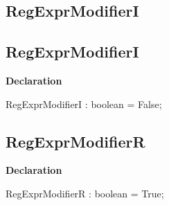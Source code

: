 \documentclass{report}
\newif\ifpdf
\begin{document}
\subsection*{\large{\textbf{RegExprModifierI}}\normalsize\hspace{1ex}\hrulefill}
\else
\subsection*{RegExprModifierI}
\fi
\label{RegExpr-RegExprModifierI}
\begin{list}{}{
\setlength{\itemindent}{0cm}
\setlength{\listparindent}{0cm}
\setlength{\leftmargin}{\evensidemargin}
\addtolength{\leftmargin}{\tmplength}
\settowidth{\labelsep}{X}
\addtolength{\leftmargin}{\labelsep}
\setlength{\labelwidth}{\tmplength}
}
\item[\textbf{Declaration}\hfill]
\ifpdf
\begin{flushleft}
\fi
\begin{ttfamily}
RegExprModifierI : boolean = False;\end{ttfamily}

\ifpdf
\end{flushleft}
\fi

\end{list}
\ifpdf
\subsection*{\large{\textbf{RegExprModifierR}}\normalsize\hspace{1ex}\hrulefill}
\else
\subsection*{RegExprModifierR}
\fi
\label{RegExpr-RegExprModifierR}
\begin{list}{}{
\setlength{\itemindent}{0cm}
\setlength{\listparindent}{0cm}
\setlength{\leftmargin}{\evensidemargin}
\addtolength{\leftmargin}{\tmplength}
\settowidth{\labelsep}{X}
\addtolength{\leftmargin}{\labelsep}
\setlength{\labelwidth}{\tmplength}
}
\item[\textbf{Declaration}\hfill]
\ifpdf
\begin{flushleft}
\fi
\begin{ttfamily}
RegExprModifierR : boolean = True;\end{ttfamily}

\ifpdf
\end{flushleft}
\fi

\end{list}
\ifpdf
\end{document}
